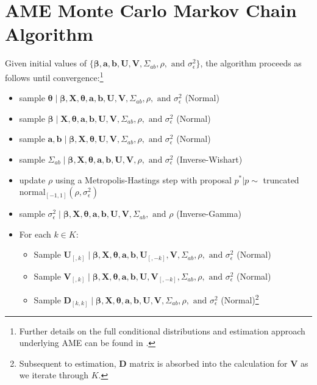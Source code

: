 \clearpage

\renewcommand{\thefigure}{\arabic{figure}}
\setcounter{figure}{0}
\renewcommand{\thetable}{\thesection \arabic{table}}
\setcounter{table}{0}
\setcounter{section}{0}

\appendix
\section{AME Monte Carlo Markov Chain Algorithm}

Given initial values of $\{\bm\beta, \mathbf{a}, \mathbf{b}, \mathbf{U}, \mathbf{V}, \Sigma_{ab}, \rho, \text{ and } \sigma_{\epsilon}^{2}\}$, the algorithm proceeds as follows until convergence:\footnote{Further details on the full conditional distributions and estimation approach underlying AME can be found in \citet{hoff:2021}.}

 \begin{itemize}
  \item sample $\bm\theta \; | \;  \bm\beta, \mathbf{X}, \bm\theta, \mathbf{a}, \mathbf{b}, \mathbf{U}, \mathbf{V}, \Sigma_{ab}, \rho, \text{ and } \sigma_{\epsilon}^{2}$ (Normal)
  \item sample $\bm\beta \; | \;  \mathbf{X}, \bm\theta, \mathbf{a}, \mathbf{b}, \mathbf{U}, \mathbf{V}, \Sigma_{ab}, \rho, \text{ and } \sigma_{\epsilon}^{2}$ (Normal)
  \item sample $\mathbf{a}, \mathbf{b} \; | \; \bm\beta, \mathbf{X}, \bm\theta, \mathbf{U}, \mathbf{V}, \Sigma_{ab}, \rho, \text{ and } \sigma_{\epsilon}^{2}$ (Normal)
  \item sample $\Sigma_{ab} \; | \; \bm\beta, \mathbf{X}, \bm\theta, \mathbf{a}, \mathbf{b}, \mathbf{U}, \mathbf{V}, \rho, \text{ and } \sigma_{\epsilon}^{2}$ (Inverse-Wishart)
  \item update $\rho$ using a Metropolis-Hastings step with proposal $p^{*} | p  \sim$ truncated normal$_{[-1,1]}(\rho, \sigma_{\epsilon}^{2})$
  \item sample $\sigma_{\epsilon}^{2} \; | \; \bm\beta, \mathbf{X}, \bm\theta, \mathbf{a}, \mathbf{b}, \mathbf{U}, \mathbf{V}, \Sigma_{ab}, \text{ and } \rho$ (Inverse-Gamma)
  \item For each $k \in K$:
  \begin{itemize}
    \item Sample $\mathbf{U}_{[,k]} \; | \; \bm\beta, \mathbf{X}, \bm\theta, \mathbf{a}, \mathbf{b}, \mathbf{U}_{[,-k]}, \mathbf{V}, \Sigma_{ab}, \rho, \text{ and } \sigma_{\epsilon}^{2}$ (Normal)
    \item Sample $\mathbf{V}_{[,k]} \; | \; \bm\beta, \mathbf{X}, \bm\theta, \mathbf{a}, \mathbf{b}, \mathbf{U}, \mathbf{V}_{[,-k]}, \Sigma_{ab}, \rho, \text{ and } \sigma_{\epsilon}^{2}$ (Normal)
    \item Sample $\mathbf{D}_{[k,k]}  \; | \; \bm\beta, \mathbf{X}, \bm\theta,\mathbf{a}, \mathbf{b}, \mathbf{U}, \mathbf{V}, \Sigma_{ab}, \rho, \text{ and } \sigma_{\epsilon}^{2}$ (Normal)\footnote{Subsequent to estimation, $\mathbf{D}$ matrix is absorbed into the calculation for $\mathbf{V}$ as we iterate through $K$. }
  \end{itemize}
 \end{itemize}
\newpage

